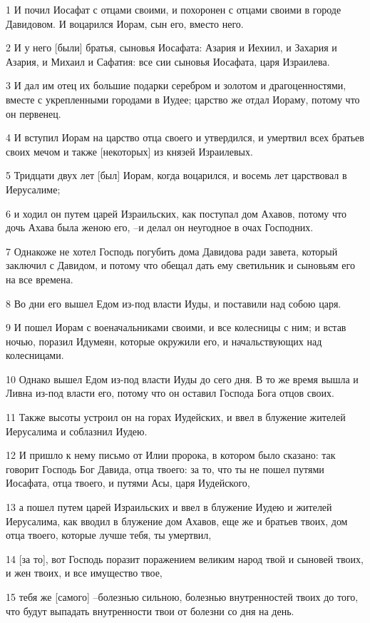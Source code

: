 \par 1 И почил Иосафат с отцами своими, и похоронен с отцами своими в городе Давидовом. И воцарился Иорам, сын его, вместо него.
\par 2 И у него [были] братья, сыновья Иосафата: Азария и Иехиил, и Захария и Азария, и Михаил и Сафатия: все сии сыновья Иосафата, царя Израилева.
\par 3 И дал им отец их большие подарки серебром и золотом и драгоценностями, вместе с укрепленными городами в Иудее; царство же отдал Иораму, потому что он первенец.
\par 4 И вступил Иорам на царство отца своего и утвердился, и умертвил всех братьев своих мечом и также [некоторых] из князей Израилевых.
\par 5 Тридцати двух лет [был] Иорам, когда воцарился, и восемь лет царствовал в Иерусалиме;
\par 6 и ходил он путем царей Израильских, как поступал дом Ахавов, потому что дочь Ахава была женою его, --и делал он неугодное в очах Господних.
\par 7 Однакоже не хотел Господь погубить дома Давидова ради завета, который заключил с Давидом, и потому что обещал дать ему светильник и сыновьям его на все времена.
\par 8 Во дни его вышел Едом из-под власти Иуды, и поставили над собою царя.
\par 9 И пошел Иорам с военачальниками своими, и все колесницы с ним; и встав ночью, поразил Идумеян, которые окружили его, и начальствующих над колесницами.
\par 10 Однако вышел Едом из-под власти Иуды до сего дня. В то же время вышла и Ливна из-под власти его, потому что он оставил Господа Бога отцов своих.
\par 11 Также высоты устроил он на горах Иудейских, и ввел в блужение жителей Иерусалима и соблазнил Иудею.
\par 12 И пришло к нему письмо от Илии пророка, в котором было сказано: так говорит Господь Бог Давида, отца твоего: за то, что ты не пошел путями Иосафата, отца твоего, и путями Асы, царя Иудейского,
\par 13 а пошел путем царей Израильских и ввел в блужение Иудею и жителей Иерусалима, как вводил в блужение дом Ахавов, еще же и братьев твоих, дом отца твоего, которые лучше тебя, ты умертвил,
\par 14 [за то], вот Господь поразит поражением великим народ твой и сыновей твоих, и жен твоих, и все имущество твое,
\par 15 тебя же [самого] --болезнью сильною, болезнью внутренностей твоих до того, что будут выпадать внутренности твои от болезни со дня на день.
